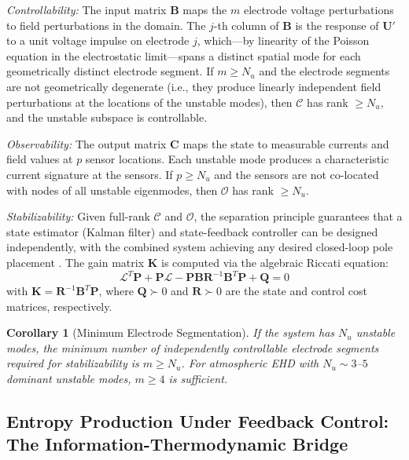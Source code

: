 \documentclass[12pt,twocolumn]{article}
\newtheorem{corollary}[theorem]{Corollary}
\newcommand{\uu}{\mathbf{U}}
\newcommand{\kk}{\mathbf{K}}
\newcommand{\Lop}{\mathcal{L}}
\begin{document}
\textit{Controllability:}
The input matrix $\mathbf{B}$ maps the $m$ electrode voltage
perturbations to field perturbations in the domain. The $j$-th
column of $\mathbf{B}$ is the response of $\uu'$ to a unit voltage
impulse on electrode $j$, which---by linearity of the Poisson
equation in the electrostatic limit---spans a distinct spatial mode
for each geometrically distinct electrode segment. If $m \geq N_u$
and the electrode segments are not geometrically degenerate (i.e.,
they produce linearly independent field perturbations at the locations
of the unstable modes), then $\mathcal{C}$ has rank $\geq N_u$, and
the unstable subspace is controllable.

\textit{Observability:}
The output matrix $\mathbf{C}$ maps the state to measurable currents
and field values at $p$ sensor locations. Each unstable mode produces
a characteristic current signature at the sensors. If $p \geq N_u$
and the sensors are not co-located with nodes of all unstable
eigenmodes, then $\mathcal{O}$ has rank $\geq N_u$.

\textit{Stabilizability:}
Given full-rank $\mathcal{C}$ and $\mathcal{O}$, the separation
principle guarantees that a state estimator (Kalman filter) and
state-feedback controller can be designed independently, with the
combined system achieving any desired closed-loop pole placement
\cite{Anderson1990}. The gain matrix $\kk$ is computed via the
algebraic Riccati equation:
\begin{equation}
  \Lop^T \mathbf{P} + \mathbf{P}\Lop
  - \mathbf{P}\mathbf{B}\mathbf{R}^{-1}\mathbf{B}^T\mathbf{P}
  + \mathbf{Q} = 0
  \label{eq:riccati}
\end{equation}
with $\kk = \mathbf{R}^{-1}\mathbf{B}^T\mathbf{P}$, where
$\mathbf{Q} \succ 0$ and $\mathbf{R} \succ 0$ are the state and
control cost matrices, respectively.

\begin{corollary}[Minimum Electrode Segmentation]
\label{cor:min_electrodes}
If the system has $N_u$ unstable modes, the minimum number of
independently controllable electrode segments required for
stabilizability is $m \geq N_u$. For atmospheric EHD with
$N_u \sim 3$--$5$ dominant unstable modes,
$m \geq 4$ is sufficient.
\end{corollary}

\subsection{Entropy Production Under Feedback Control:
  The Information-Thermodynamic Bridge}
\label{sec:stability:entropy_ctrl}
\end{document}

